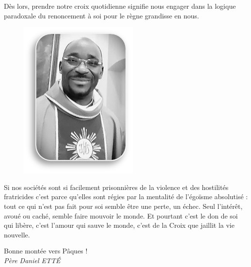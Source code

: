 Dès lors,
prendre notre croix quotidienne signifie nous engager dans la logique paradoxale du renoncement à soi pour le règne grandisse en nous.
\begin{figure}
\vspace{-0.5cm}
	\includegraphics{daniel_ette.png}
\end{figure}
Si nos sociétés sont si facilement prisonnières de la violence et des hostilités fratricides c’est parce qu’elles sont régies par la mentalité de l’égoïsme absolutisé : tout ce qui n’est pas fait pour soi semble être une perte, un échec. Seul l’intérêt, avoué ou caché, semble faire mouvoir le monde. Et pourtant c’est le don de 
soi qui libère, c’est l’amour qui sauve le monde, c’est de la Croix que jaillit la vie nouvelle.                                                                                                                                                                

\begin{flushright}
Bonne montée vers Pâques !\\
\textit{Père  Daniel  ETTÉ}
\end{flushright}
